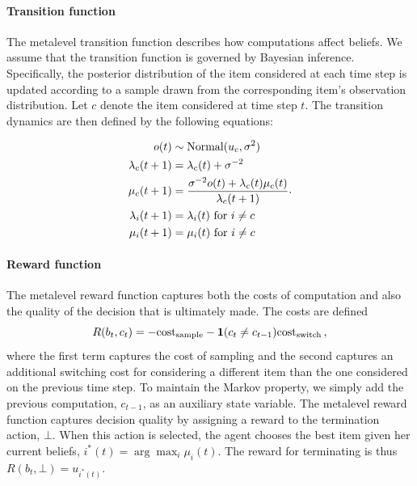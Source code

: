 \documentclass[12pt,a4paperpaper,]{article}
\begin{document}
\paragraph{Transition function}
The metalevel transition function describes how computations affect beliefs. We assume that the transition function is governed by Bayesian inference. Specifically, the posterior distribution of the item considered at each time step is updated according to a sample drawn from the corresponding item's observation distribution. Let $c$ denote the item considered at time step $t$. The transition dynamics are then defined by the following equations:

\begin{equation}
\begin{aligned}
  o(t) &\sim \mathrm{Normal}(u_{c}, \sigma^2) \\
  \lambda_c(t+1) &= \lambda_c(t) + \sigma^{-2}  \\
  \mu_{c}(t+1) &= \frac{\sigma^{-2} o(t) + \lambda_{c}(t) \mu_{c}(t)}{\lambda_{c}(t+1)}  \\
  \lambda_i(t+1) &= \lambda_i(t) \text{ for } i \neq c  \\
  \mu_i(t+1) &= \mu_i(t) \text{ for } i \neq c  \\
\end{aligned}
.
\end{equation}

\paragraph{Reward function}
The metalevel reward function captures both the costs of computation and also the quality of the decision that is ultimately made. The costs are defined
%
\begin{equation}
R(b_t, c_t) = -\text{cost}_\text{sample} - \mathbf{1}(c_t \neq c_{t-1}) \text{cost}_\text{switch}
\,,
\end{equation}
%
where the first term captures the cost of sampling and the second captures an additional switching cost for considering a different item than the one considered on the previous time step. To maintain the Markov property, we simply add the previous computation, $c_{t-1}$, as an auxiliary state variable. 
The metalevel reward function captures decision quality by assigning a reward to the termination action, $\bot$. When this action is selected, the agent chooses the best item given her current beliefs, $i^*(t) = \arg\max_i \mu_i(t)$. 
The reward for terminating is thus $R(b_t, \bot) = u_{i^*(t)}$.
\end{document}
